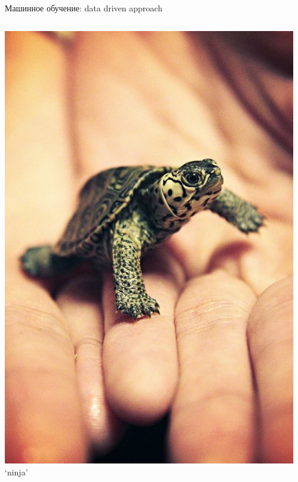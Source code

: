 \documentclass[aspectratio=169, professionalfonts]{beamer}
\begin{document}
\begin{frame}{Машинное обучение: data driven approach}
\begin{columns}
\begin{column}{.1\linewidth}
            \includegraphics[width=\linewidth]{figures/fig35-dataset-sample.jpg}
            `ninja'
        \end{column}
        \begin{column}{.1\linewidth}
            \centering

\end{column}
\end{columns}
\end{frame}
\end{document}
